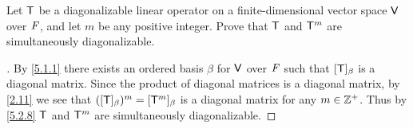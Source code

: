 \begin{ex}\label{ex:5.2.19}
  Let \(\mathsf{T}\) be a diagonalizable linear operator on a finite-dimensional vector space \(\mathsf{V}\) over \(\mathit{F}\), and let \(m\) be any positive integer.
  Prove that \(\mathsf{T}\) and \(\mathsf{T}^m\) are simultaneously diagonalizable.
\end{ex}

\begin{proof}[]
  By \cref{5.1.1} there exists an ordered basis \(\beta\) for \(\mathsf{V}\) over \(\mathit{F}\) such that \([\mathsf{T}]_{\beta}\) is a diagonal matrix.
  Since the product of diagonal matrices is a diagonal matrix, by \cref{2.11} we see that \(([\mathsf{T}]_{\beta})^m = [\mathsf{T}^m]_{\beta}\) is a diagonal matrix for any \(m \in \mathbb{Z}^+\).
  Thus by \cref{5.2.8} \(\mathsf{T}\) and \(\mathsf{T}^m\) are simultaneously diagonalizable.
\end{proof}
